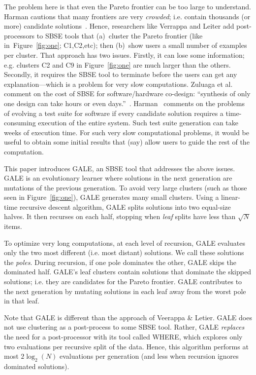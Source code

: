 \documentclass[10pt,journal,compsoc]{IEEEtran}
\newcommand{\fig}[1]{Figure~\ref{fig:#1}}
\begin{document}
The problem here is that even the Pareto frontier can be too large to understand.
Harman cautions that many frontiers are very {\em crowded}; i.e. contain thousands (or more)
candidate solutions~\cite{harm13}.
Hence, researchers like  Verrappa and Leiter add post-processors to SBSE
tools that (a)~cluster the Pareto frontier (like in~\fig{one};  C1,C2,etc);
then (b)~show users a small number of examples per cluster. 
That approach has two issues. Firstly, it can lose some information;
e.g. clusters C2 and C9 in \fig{one} are much larger
than the others. 
Secondly, it requires the SBSE tool to terminate
before the users can get any explanation---which is a
problem for very slow computations.  Zuluaga et
al. comment on the cost of SBSE for
software/hardware co-design: ``synthesis of only one
design can take hours or even
days.''~\cite{Zuluaga:13}.  Harman~\cite{harm13}
comments on the problems of evolving a test suite
for software if every candidate solution requires a
time-consuming execution of the entire system. Such
test suite generation can take weeks of execution
time. For such very slow computational problems, it
would be useful to obtain some initial results that
(say) allow users to guide the rest of the
computation.

This paper introduces GALE, an SBSE tool that addresses
the above issues.
GALE is an evolutionary learner
where solutions in the next generation
are mutations of the previous generation.
To avoid very large clusters (such as those seen in \fig{one}),
GALE generates many small
clusters. Using  a linear-time recursive
descent algorithm, GALE splits solutions into two
equal-size halves. It then recurses on each half,
stopping when {\em leaf} splits have less than   $\sqrt{N}$
items.

To optimize very long computations, at each level of
recursion,  GALE 
evaluates only the two most different (i.e. most distant)
solutions.  We call
these solutions the {\em poles}.
During recursion, if one pole dominates
the other, GALE skips the dominated half.
GALE's leaf clusters contain solutions
that dominate the skipped solutions; i.e.
they
are candidates for the Pareto frontier.
GALE contributes to the next generation by mutating solutions
in each leaf  away from the worst pole in that leaf.

Note that GALE is different than the approach
of Veerappa \& Letier.
GALE does not use clustering as a post-process to some SBSE tool.
Rather, GALE {\em replaces} the need for a post-processor with its tool called WHERE, which explores only two evaluations per recursive split
of the data. Hence, this algorithm
performs at most $2{\log_2}(N)$ evaluations per
generation (and less when recursion ignores
dominated solutions). 
\end{document}
